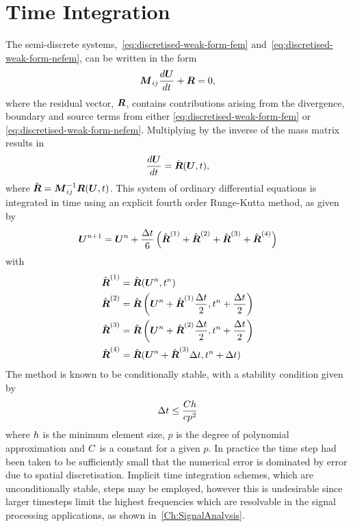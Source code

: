 
\section{Time Integration}
The semi-discrete systems,~\eqref{eq:discretised-weak-form-fem} and~\eqref{eq:discretised-weak-form-nefem}, can be written in the form
$$
\boldsymbol{M}_{ij} \frac{d \boldsymbol{U}}{d t} + \boldsymbol{R} = 0 ,
$$
where the residual vector, $\boldsymbol{R}$, contains contributions arising from the divergence, boundary and source terms from either \eqref{eq:discretised-weak-form-fem} or \eqref{eq:discretised-weak-form-nefem}. Multiplying by the inverse of the mass matrix results in
$$
\frac{d \boldsymbol{U}}{d t} = \hat{\boldsymbol{R}}(\boldsymbol{U},t) ,
$$
where $\hat{\boldsymbol{R}} = \boldsymbol{M}_{ij}^{-1} \boldsymbol{R}(\boldsymbol{U},t)$.
This system of ordinary differential equations is integrated in time using an explicit fourth order Runge-Kutta method, as given by
$$
\boldsymbol{U}^{n+1} = \boldsymbol{U}^{n} + \frac{\Delta t}{6}
\left( 
  \hat{\boldsymbol{R}}^{(1)}
+  \hat{\boldsymbol{R}}^{(2)}
+  \hat{\boldsymbol{R}}^{(3)}
+  \hat{\boldsymbol{R}}^{(4)}
\right)
$$
with
\begin{align}
\hat{\boldsymbol{R}}^{(1)} &= \hat{\boldsymbol{R}}(\boldsymbol{U}^n,t^n) \\
\hat{\boldsymbol{R}}^{(2)} &= \hat{\boldsymbol{R}}
  \left( 
    \boldsymbol{U}^n + \hat{\boldsymbol{R}}^{(1)} \frac{\Delta t}{2},t^{n} + \frac{\Delta t}{2}
 \right) \\
\hat{\boldsymbol{R}}^{(3)} &= \hat{\boldsymbol{R}}
  \left( 
    \boldsymbol{U}^n + \hat{\boldsymbol{R}}^{(2)} \frac{\Delta t}{2},t^{n} + \frac{\Delta t}{2}
 \right) \\
\hat{\boldsymbol{R}}^{(4)} &= \hat{\boldsymbol{R}}(\boldsymbol{U}^n + \hat{\boldsymbol{R}}^{(3)} \Delta t,t^{n} + \Delta t) \\
\label{eq:3}
\end{align}
The method is known to be conditionally stable, with a stability condition given by
$$
\Delta t \le  \frac{ C h }{ c p^2}
$$
where $h$ is the minimum element size, $p$ is the degree of polynomial approximation and $C$ is a constant for a given $p$.
In practice the time step had been taken to be sufficiently small that the numerical error is dominated by error due to spatial discretisation. Implicit time integration schemes, which are unconditionally stable, steps may be employed, however this is undesirable since larger timesteps limit the highest frequencies which are resolvable in the signal processing applications, as shown in~\autoref{Ch:SignalAnalysis}.

